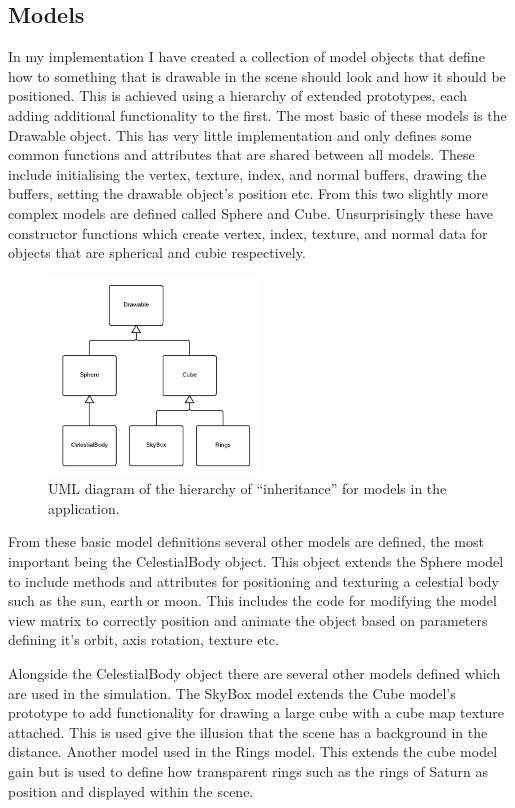 \documentclass[paper=a4, fontsize=11pt]{scrartcl}	%
\numberwithin{equation}{section}															%
\numberwithin{figure}{section}																%
\numberwithin{table}{section}																%
\begin{document}
\subsection{Models}
In my implementation I have created a collection of model objects that define how to something that is drawable in the scene should look and how it should be positioned. This is achieved using a hierarchy of extended prototypes, each adding additional functionality to the first. The most basic of these models is the Drawable object. This has very little implementation and only defines some common functions and attributes that are shared between all models. These include initialising the vertex, texture, index, and normal buffers, drawing the buffers, setting the drawable object's position etc. From this two slightly more complex models are defined called Sphere and Cube. Unsurprisingly these have constructor functions which create vertex, index, texture, and normal data for objects that are spherical and cubic respectively.

\begin{figure}[H]
\centering
\includegraphics[width=0.5\textwidth]{img/model-uml.png}
\caption{UML diagram of the hierarchy of ``inheritance'' for models in the  application.}
\label{fig:uml-models}
\end{figure}

From these basic model definitions several other models are defined, the most important being the CelestialBody object. This object extends the Sphere model to include methods and attributes for positioning and texturing a celestial body such as the sun, earth or moon. This includes the code for modifying the model view matrix to correctly position and animate the object based on parameters defining it's orbit, axis rotation, texture etc.

Alongside the CelestialBody object there are several other models defined which are used in the simulation. The SkyBox model extends the Cube model's prototype to add functionality for drawing a large cube with a cube map texture attached. This is used give the illusion that the scene has a background in the distance. Another model used in the Rings model. This extends the cube model gain but is used to define how transparent rings such as the rings of Saturn as position and displayed within the scene.
\end{document}
